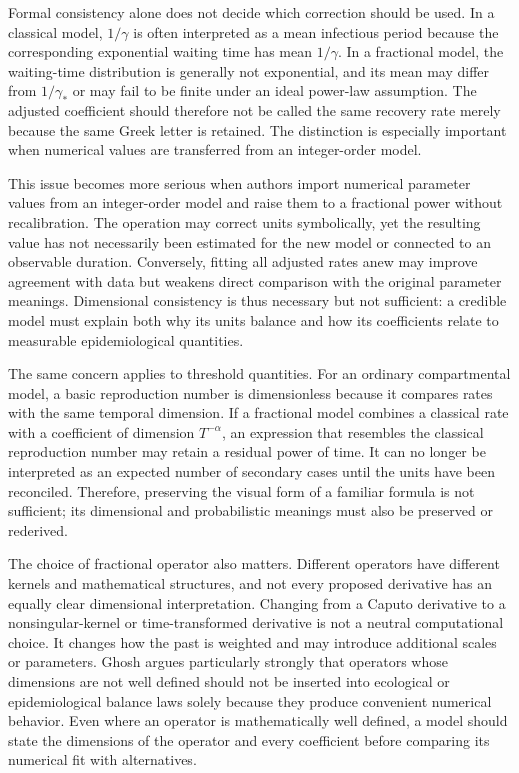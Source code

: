 \documentclass[00-main.tex]{subfiles}
\begin{document}
Formal consistency alone does not decide which correction should be used.
In a classical model, $1/\gamma$ is often interpreted as a mean infectious period because the corresponding exponential waiting time has mean $1/\gamma$.
In a fractional model, the waiting-time distribution is generally not exponential, and its mean may differ from $1/\gamma_*$ or may fail to be finite under an ideal power-law assumption.
The adjusted coefficient should therefore not be called the same recovery rate merely because the same Greek letter is retained.
The distinction is especially important when numerical values are transferred from an integer-order model.

This issue becomes more serious when authors import numerical parameter values from an integer-order model and raise them to a fractional power without recalibration.
The operation may correct units symbolically, yet the resulting value has not necessarily been estimated for the new model or connected to an observable duration.
Conversely, fitting all adjusted rates anew may improve agreement with data but weakens direct comparison with the original parameter meanings.
Dimensional consistency is thus necessary but not sufficient: a credible model must explain both why its units balance and how its coefficients relate to measurable epidemiological quantities.

The same concern applies to threshold quantities.
For an ordinary compartmental model, a basic reproduction number is dimensionless because it compares rates with the same temporal dimension.
If a fractional model combines a classical rate with a coefficient of dimension $T^{-\alpha}$, an expression that resembles the classical reproduction number may retain a residual power of time.
It can no longer be interpreted as an expected number of secondary cases until the units have been reconciled.
Therefore, preserving the visual form of a familiar formula is not sufficient; its dimensional and probabilistic meanings must also be preserved or rederived.

The choice of fractional operator also matters.
Different operators have different kernels and mathematical structures, and not every proposed derivative has an equally clear dimensional interpretation.
Changing from a Caputo derivative to a nonsingular-kernel or time-transformed derivative is not a neutral computational choice.
It changes how the past is weighted and may introduce additional scales or parameters.
Ghosh argues particularly strongly that operators whose dimensions are not well defined should not be inserted into ecological or epidemiological balance laws solely because they produce convenient numerical behavior.
Even where an operator is mathematically well defined, a model should state the dimensions of the operator and every coefficient before comparing its numerical fit with alternatives.
\end{document}
